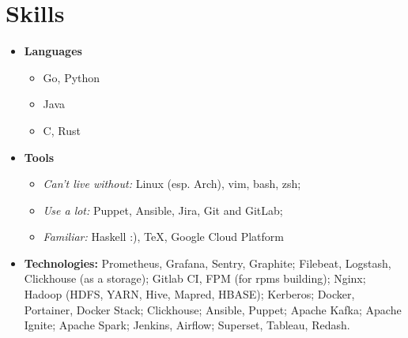 \documentclass[letterpaper,10pt]{article}
\begin{document}
\begin{minipage}[t]{0.33\textwidth} 

\section{Skills}
\begin{itemize}[leftmargin=*]
	\item{ \textbf{Languages}{\vspace{-8pt}}
		 \begin{itemize}
			 \item{Go, Python}
			 \item{Java}
			 \item{C, Rust}
		\end{itemize}
    }
	\item{ \textbf{Tools}{\vspace{-8pt}}
		 \begin{itemize}
			 \item{\textit{\small{Can't live without:}}\newline}
			Linux (esp. Arch), vim, bash, zsh;
			  \item{\textit{\small{Use a lot:}}\newline}
			Puppet, Ansible, Jira, Git and GitLab;
			 \item{\textit{\small{Familiar:}}\newline}
			 Haskell :), TeX,  Google Cloud Platform
		\end{itemize}

    }
	\item{ \textbf{Technologies:}{\vspace{-0pt}}\newline
	    Prometheus, Grafana, Sentry, Graphite;        \newline
	    Filebeat, Logstash, Clickhouse (as a storage);\newline
	    Gitlab CI, FPM (for rpms building);           \newline
	    Nginx;\newline
		Hadoop (HDFS, YARN, Hive, Mapred, HBASE);     \newline
		Kerberos;\newline
		Docker, Portainer, Docker Stack;              \newline
		Clickhouse;                                   \newline
		Ansible, Puppet;                              \newline
		Apache Kafka;                                 \newline
		Apache Ignite;\newline
		Apache Spark;\newline
		Jenkins, Airflow;\newline
		Superset, Tableau, Redash.
    }
 \end{itemize}
 



\end{minipage}
\end{document}
